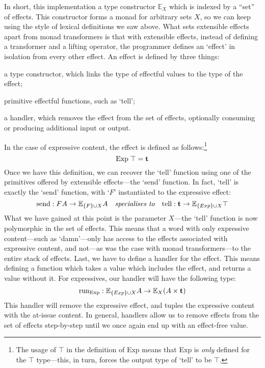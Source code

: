 In short, this implementation a type constructor $\mathbb{E}_X$ which
is indexed by a ``set'' of effects. This constructor forms a monad for
arbitrary sets $X$, so we can keep using the style of lexical
definitions we saw above.
What sets extensible effects apart from monad transformers is that
with extensible effects, instead of defining a transformer and a
lifting operator, the programmer defines an `effect' in isolation from
every other effect. An effect is defined by three things:
\begin{enumerate*}[label=\arabic*)]
\item a type constructor, which links the type of effectful values to
  the type of the effect;
\item primitive effectful functions, such as `tell';
\item a handler, which removes the effect from the set of effects,
  optionally consuming or producing additional input or output.
\end{enumerate*}
In the case of expressive content, the effect is
defined as follows:\footnote{%
  The usage of $\top$ in the definition of Exp means that Exp is
  \emph{only} defined for the $\top$ type---this, in turn, forces the
  output type of `tell' to be $\top$.
}
\[
  \text{Exp}\;\top=\mathbf{t}
\]
Once we have this definition, we can recover the `tell' function using
one of the primitives offered by extensible effects---the `send'
function. In fact, `tell' is exactly the `send' function, with `$F$'
instantiated to the expressive effect:
\[
  \text{send} : FA\rightarrow\mathbb{E}_{\{F\}\cup X}A
  \quad
  \textit{specialises to}
  \quad
  \text{tell} : \mathbf{t}\rightarrow\mathbb{E}_{\{Exp\}\cup X}\top
\]
What we have gained at this point is the parameter $X$---the `tell'
function is now polymorphic in the set of effects. This means that a
word with only expressive content---such as `damn'---only has access
to the effects associated with expressive content, and not---as was
the case with monad transformers---to the entire stack of effects.
Last, we have to define a handler for the effect. This means defining
a function which takes a value which includes the effect, and returns
a value without it. For expressives, our handler will have the
following type:
\[
  \text{run}_{\text{Exp}} : \mathbb{E}_{\{Exp\}\cup X}A\rightarrow\mathbb{E}_{X}(A\times\mathbf{t})
\]
This handler will remove the expressive effect, and tuples the
expressive content with the at-issue content. In general, handlers
allow us to remove effects from the set of effects step-by-step until
we once again end up with an effect-free value.
